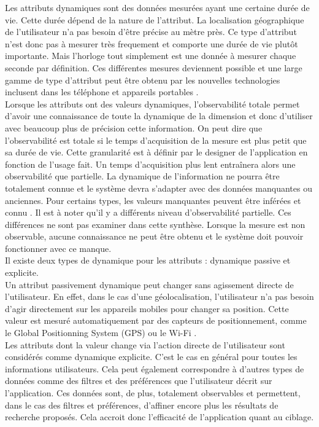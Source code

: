 \documentclass[conference]{./sty/IEEEtran}
\begin{document}
Les attributs dynamiques sont des données mesurées ayant une certaine durée de
vie. Cette durée dépend de la nature de l'attribut. La localisation
géographique de l'utilisateur n'a pas besoin d'être précise au mètre près. Ce
type d'attribut n'est donc pas à mesurer très frequement et comporte une durée
de vie plutôt importante. Mais l'horloge tout simplement est une donnée à
mesurer chaque seconde par définition. Ces différentes mesures deviennent
possible et une large gamme de type d'attribut peut être obtenu par les
nouvelles technologies inclusent dans les téléphone et appareils portables
\cite{DBLP:conf/wstst/Kurti08}. \\

Lorsque les attributs ont des valeurs dynamiques, l'observabilité totale permet
d'avoir une connaissance de toute la dynamique de la dimension et donc
d'utiliser avec beaucoup plus de précision cette information. On peut dire que
l'observabilité est totale si le temps d'acquisition de la mesure est plus
petit que sa durée de vie. Cette granularité est à définir par le designer de
l'application en fonction de l'usage fait. Un temps d'acquisition plus lent
entraînera alors une observabilité que partielle. La dynamique de l'information
ne pourra être totalement connue et le système devra s'adapter avec des données
manquantes ou anciennes. Pour certains types, les valeurs manquantes peuvent
être inférées et connu \cite{DBLP:journals/prl/TruccoFR99}. Il est à noter
qu'il y a différents niveau d'observabilité partielle. Ces différences ne sont
pas examiner dans cette synthèse. Lorsque la mesure est non observable, aucune
connaissance ne peut être obtenu et le système doit pouvoir fonctionner avec ce
manque. \\

Il existe deux types de dynamique pour les attributs : dynamique passive et
explicite. \\
Un attribut passivement dynamique peut changer sans agissement
directe de l'utilisateur. En effet, dans le cas d'une géolocalisation,
l'utilisateur n'a pas besoin d'agir directement sur les appareils mobiles pour
changer sa position. Cette valeur est mesuré automatiquement par des capteurs
de positionnement, comme le Global Positionning System (GPS) ou le Wi-Fi
\cite{DBLP:journals/tlt/VerbertMOWDBD12}. \\
Les attributs dont la valeur change via l'action directe de l'utilisateur sont
considérés comme dynamique explicite. C'est le cas en général pour toutes les
informations utilisateurs. Cela peut également correspondre à d'autres types de
données comme des filtres et des préférences que l'utilisateur décrit sur
l'application. Ces données sont, de plus, totalement observables et permettent,
dans le cas des filtres et préférences, d'affiner encore plus les résultats de
recherche proposés. Cela accroit donc l'efficacité de l'application quant au
ciblage. \\
\end{document}
